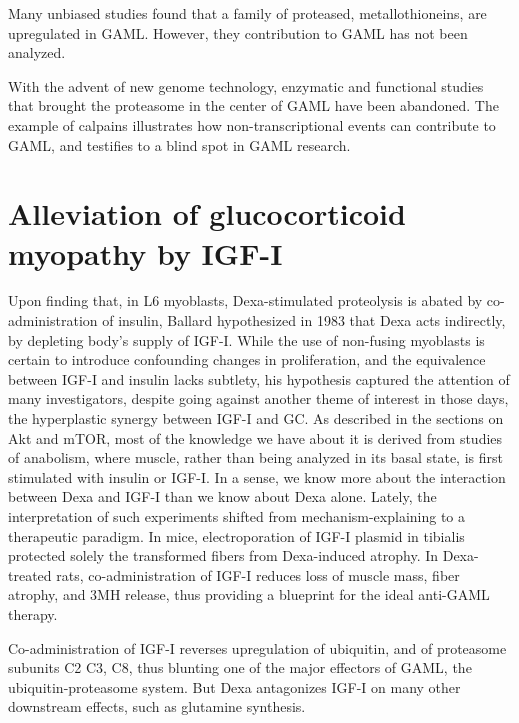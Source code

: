 \documentclass[12pt,english]{report}\usepackage[]{graphicx}\usepackage[]{color}
\begin{document}
Many unbiased studies found that a family of proteased, metallothioneins,
are upregulated in GAML\citep{lecker2004multiple}. However, they
contribution to GAML has not been analyzed.

With the advent of new genome technology, enzymatic and functional
studies that brought the proteasome in the center of GAML have been
abandoned. The example of calpains illustrates how non-transcriptional
events can contribute to GAML, and testifies to a blind spot in GAML
research.


\section{Alleviation of glucocorticoid myopathy by IGF-I}

Upon finding that, in L6 myoblasts, Dexa-stimulated proteolysis is
abated by co-administration of insulin, Ballard hypothesized in 1983
that Dexa acts indirectly, by depleting body's supply of IGF-I\citep{ballard1983effects}.
While the use of non-fusing myoblasts is certain to introduce confounding
changes in proliferation, and the equivalence between IGF-I and insulin
lacks subtlety, his hypothesis captured the attention of many investigators,
despite going against another theme of interest in those days, the
hyperplastic synergy between IGF-I and GC\citep{ewton1981effects,elsner1998regulation}.
As described in the sections on Akt and mTOR, most of the knowledge
we have about it is derived from studies of anabolism, where muscle,
rather than being analyzed in its basal state, is first stimulated
with insulin or IGF-I. In a sense, we know more about the interaction
between Dexa and IGF-I than we know about Dexa alone. Lately, the
interpretation of such experiments shifted from mechanism-explaining
to a therapeutic paradigm. In mice, electroporation of IGF-I plasmid
in tibialis protected solely the transformed fibers from Dexa-induced
atrophy\citep{schakman2005insulin-like}. In Dexa-treated rats, co-administration
of IGF-I reduces loss of muscle mass, fiber atrophy, and 3MH release\citep{kanda1999preventive},
thus providing a blueprint for the ideal anti-GAML therapy.

Co-administration of IGF-I reverses upregulation of ubiquitin, and
of proteasome subunits C2 C3, C8\citep{chrysis2002divergent,chrysis1999regulation},
thus blunting one of the major effectors of GAML, the ubiquitin-proteasome
system. But Dexa antagonizes IGF-I on many other downstream effects,
such as glutamine synthesis\citep{kimura2001insulin-like}.
\end{document}
